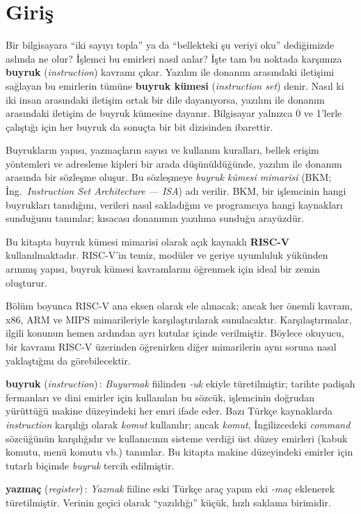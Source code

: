 \section{Giriş}

Bir bilgisayara ``iki sayıyı topla'' ya da ``bellekteki şu veriyi oku'' dediğimizde aslında ne olur? İşlemci bu emirleri nasıl anlar? İşte tam bu noktada karşımıza \textbf{buyruk} (\emph{instruction}) kavramı çıkar. Yazılım ile donanım arasındaki iletişimi sağlayan bu emirlerin tümüne \textbf{buyruk kümesi} (\emph{instruction set}) denir. Nasıl ki iki insan arasındaki iletişim ortak bir dile dayanıyorsa, yazılım ile donanım arasındaki iletişim de buyruk kümesine dayanır. Bilgisayar yalnızca 0 ve 1'lerle çalıştığı için her buyruk da sonuçta bir bit dizisinden ibarettir.

Buyrukların yapısı, yazmaçların sayısı ve kullanım kuralları, bellek erişim yöntemleri ve adresleme kipleri bir arada düşünüldüğünde, yazılım ile donanım arasında bir sözleşme oluşur. Bu sözleşmeye \emph{buyruk kümesi mimarisi} (BKM; İng.\ \emph{Instruction Set Architecture --- ISA}) adı verilir. BKM, bir işlemcinin hangi buyrukları tanıdığını, verileri nasıl sakladığını ve programcıya hangi kaynakları sunduğunu tanımlar; kısacası donanımın yazılıma sunduğu arayüzdür.

Bu kitapta buyruk kümesi mimarisi olarak açık kaynaklı \textbf{RISC-V} kullanılmaktadır. RISC-V'in temiz, modüler ve geriye uyumluluk yükünden arınmış yapısı, buyruk kümesi kavramlarını öğrenmek için ideal bir zemin oluşturur.

Bölüm boyunca RISC-V ana eksen olarak ele alınacak; ancak her önemli kavram, x86, ARM ve MIPS mimarileriyle karşılaştırılarak sunulacaktır. Karşılaştırmalar, ilgili konunun hemen ardından ayrı kutular içinde verilmiştir. Böylece okuyucu, bir kavramı RISC-V üzerinden öğrenirken diğer mimarilerin aynı soruna nasıl yaklaştığını da görebilecektir.

\begin{terimnotu}
\textbf{buyruk} (\emph{instruction})\,: \emph{Buyurmak} fiilinden \emph{-uk} ekiyle türetilmiştir; tarihte padişah fermanları ve dini emirler için kullanılan bu sözcük, işlemcinin doğrudan yürüttüğü makine düzeyindeki her emri ifade eder. Bazı Türkçe kaynaklarda \emph{instruction} karşılığı olarak \emph{komut} kullanılır; ancak \emph{komut}, İngilizcedeki \emph{command} sözcüğünün karşılığıdır ve kullanıcının sisteme verdiği üst düzey emirleri (kabuk komutu, menü komutu vb.) tanımlar. Bu kitapta makine düzeyindeki emirler için tutarlı biçimde \emph{buyruk} tercih edilmiştir.

\textbf{yazmaç} (\emph{register})\,: \emph{Yazmak} fiiline eski Türkçe araç yapım eki \emph{-maç} eklenerek türetilmiştir. Verinin geçici olarak ``yazıldığı'' küçük, hızlı saklama birimidir.
\end{terimnotu}

